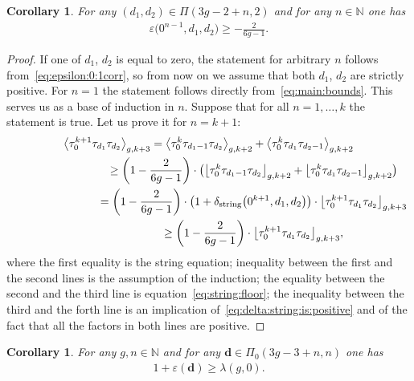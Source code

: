 \documentclass[pdftex]{sigma}
\renewcommand{\epsilon}{\varepsilon}
\newcommand\N{\mathbb N}
\newtheorem{Corollary}[Theorem]{Corollary}
\theoremstyle{definition}
\begin{document}
\begin{Corollary}\label{cor:epsilon:0:2corr}
For any $(d_1,d_2)\in\Pi(3g-2+n,2)$ and for any $n\in\N$
one has
\begin{gather}\label{eq:epsilon:0:2corr}
\epsilon\big(0^{n-1},d_1,d_2\big)\ge -\frac{2}{6g-1} .
\end{gather}
\end{Corollary}
\begin{proof}If one of $d_1$, $d_2$
is equal to zero, the statement for arbitrary $n$
follows from~\eqref{eq:epsilon:0:1corr}, so from now on
we assume
that both $d_1$, $d_2$ are strictly positive.
For $n=1$ the statement follows directly from~\eqref{eq:main:bounds}.
This serves us as a base of induction
in $n$. Suppose that for all $n=1,\dots,k$ the statement
is true. Let us prove it for $n=k+1$:
\begin{gather*}
\big\langle \tau_0^{k+1}\tau_{d_1}\tau_{d_2}\big\rangle_{g,k+3}
=\big\langle \tau_0^k\tau_{d_1-1}\tau_{d_2}\big\rangle_{g,k+2}
+\big\langle \tau_0^k\tau_{d_1}\tau_{d_2-1}\big\rangle_{g,k+2}\\
\hphantom{\big\langle \tau_0^{k+1}\tau_{d_1}\tau_{d_2}\big\rangle_{g,k+3}}{} \ge
\left(1-\frac{2}{6g-1}\right)\cdot
\big(\big\lfloor \tau_0^k\tau_{d_1-1}\tau_{d_2}\big\rfloor_{g,k+2}
+\big\lfloor \tau_0^k\tau_{d_1}\tau_{d_2-1}\big\rfloor_{g,k+2}
\big)\\
\hphantom{\big\langle \tau_0^{k+1}\tau_{d_1}\tau_{d_2}\big\rangle_{g,k+3}}{}
 =
\left(1-\frac{2}{6g-1}\right)
\cdot\big(1+\delta_{\rm string}\big(0^{k+1},d_1,d_2\big)\big)\cdot
\big\lfloor \tau_0^{k+1}\tau_{d_1}\tau_{d_2}\big\rfloor_{g,k+3}\\
\hphantom{\big\langle \tau_0^{k+1}\tau_{d_1}\tau_{d_2}\big\rangle_{g,k+3}}{} \ge
\left(1-\frac{2}{6g-1}\right)\cdot
\big\lfloor \tau_0^{k+1}\tau_{d_1}\tau_{d_2}\big\rfloor_{g,k+3} ,
\end{gather*}
where the first equality is the string equation;
inequality between the first and the second lines is
the assumption of the induction; the equality
between the second and the third line is
equation~\eqref{eq:string:floor}; the inequality
between the third and the forth line is
an implication of~\eqref{eq:delta:string:is:positive}
and of the fact that all the factors in both lines are
positive.
\end{proof}

\begin{Corollary}\label{cor:L:equals:0}
For any $g,n\in\N$ and for any
$\boldsymbol{d}\in\Pi_0(3g-3+n,n)$ one has
\begin{gather}\label{eq:epsilon:is:smaller:than:lambda:0}
1+\epsilon(\boldsymbol{d})\ge\lambda(g,0) .
\end{gather}
\end{Corollary}
\end{document}
